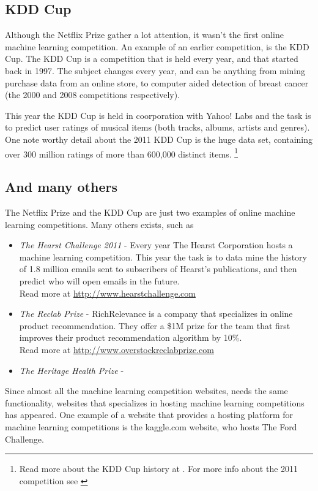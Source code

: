 \subsection{KDD Cup}
Although the Netflix Prize gather a lot attention, it wasn't the first online machine learning competition. An example of an earlier competition, is the KDD Cup. The KDD Cup is a competition that is held every year, and that started back in 1997. The subject changes every year, and can be anything from mining purchase data from an online store, to computer aided detection of breast cancer (the 2000 and 2008 competitions respectively).\par
This year the KDD Cup is held in coorporation with Yahoo! Labs and the task is to predict user ratings of musical items (both tracks, albums, artists and genres). One note worthy detail about the 2011 KDD Cup is the huge data set, containing over 300 million ratings of more than 600,000 distinct items. \footnote{Read more about the KDD Cup history at \citep{kdd_cup_center}. For more info about the 2011 competition see \citep{kdd_cup_2011}}

\subsection{And many others}
The Netflix Prize and the KDD Cup are just two examples of online machine learning competitions. Many others exists, such as
\begin{itemize}
    \item \emph{The Hearst Challenge 2011} - Every year The Hearst Corporation hosts a machine learning competition. This year the task is to data mine the history of 1.8 million emails sent to subscribers of Hearst's publications, and then predict who will open emails in the future. \\
        Read more at \url{http://www.hearstchallenge.com}
    \item \emph{The Reclab Prize} - RichRelevance is a company that specializes in online product recommendation. They offer a \$1M prize for the team that first improves their product recommendation algorithm by 10\%. \\
        Read more at \url{http://www.overstockreclabprize.com}
    \item \emph{The Heritage Health Prize} - 
\end{itemize}
Since almost all the machine learning competition websites, needs the same functionality, websites that specializes in hosting machine learning competitions has appeared. One example of a website that provides a hosting platform for machine learning competitions is the kaggle.com website, who hosts The Ford Challenge.

